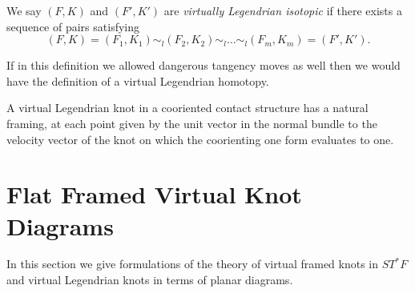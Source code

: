 We say $(F,K)$ and $(F',K')$ are {\it virtually Legendrian isotopic} if there exists a sequence of pairs satisfying  $$(F,K)=(F_1,K_1)\sim_l (F_2, K_2)\sim_l \dots \sim_l (F_m,K_m)=(F',K').$$

\begin{rem} If in this definition we allowed dangerous tangency moves as well then we would have the definition of a virtual Legendrian homotopy.
\end{rem}

\begin{rem} A virtual Legendrian knot in a cooriented contact structure has a natural framing, at each point given by the unit vector in the normal bundle to the velocity vector of the knot on which the coorienting one form evaluates to one.
\end{rem}

	
	


\section{Flat Framed Virtual Knot Diagrams}
In this section we give formulations of the theory of virtual framed knots in $ST^*F$ and virtual Legendrian knots in terms of planar diagrams.
